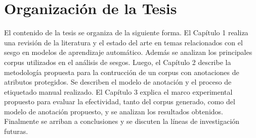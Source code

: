 \section*{Organizaci\'on de la Tesis}
El contenido de la tesis se organiza de la siguiente forma. El Cap\'itulo 1 realiza una revisi\'on de la literatura y el estado del 
arte en temas relacionados con el sesgo en modelos de aprendizaje autom\'atico. Adem\'as se analizan los principales corpus 
utilizados en el an\'alisis de sesgos. Luego, el Cap\'itulo 2 describe la metodolog\'ia propuesta para la contrucci\'on de un 
corpus con anotaciones de atributos protegidos. Se describen el modelo de anotaci\'on y el proceso de etiquetado manual realizado. 
El Cap\'itulo 3 explica el marco experimental propuesto para evaluar la efectividad, tanto del corpus generado, como del modelo de 
anotaci\'on propuesto, y se analizan los resultados obtenidos. Finalmente se arriban a conclusiones y se discuten la l\'ineas de 
investigaci\'on futuras.  
